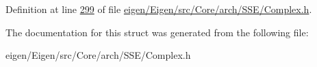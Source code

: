 Definition at line \hyperlink{eigen_2_eigen_2src_2_core_2arch_2_s_s_e_2_complex_8h_source_l00299}{299} of file \hyperlink{eigen_2_eigen_2src_2_core_2arch_2_s_s_e_2_complex_8h_source}{eigen/\+Eigen/src/\+Core/arch/\+S\+S\+E/\+Complex.\+h}.



The documentation for this struct was generated from the following file\+:\begin{DoxyCompactItemize}
\item 
eigen/\+Eigen/src/\+Core/arch/\+S\+S\+E/\+Complex.\+h\end{DoxyCompactItemize}
